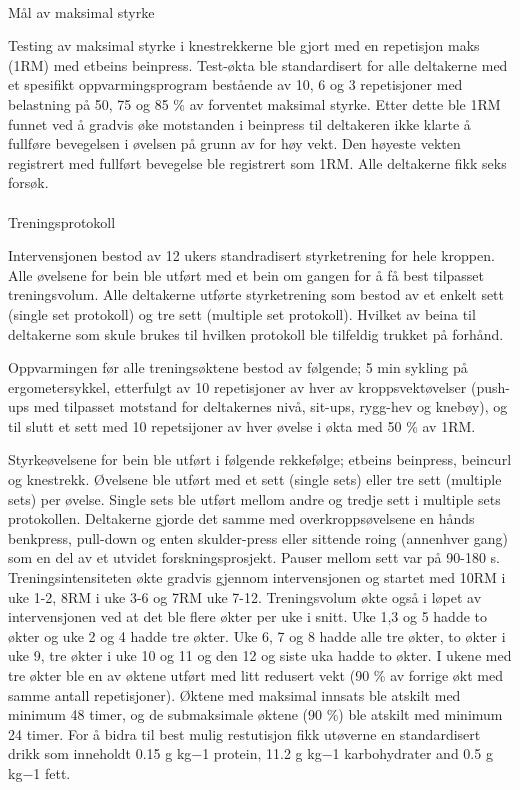 \documentclass[
  letterpaper,
  DIV=11,
  numbers=noendperiod]{scrreprt}
\makeatletter
\let\oldparagraph\paragraph
\renewcommand{\paragraph}{
    \@ifstar
      \xxxParagraphStar
      \xxxParagraphNoStar
  }
\newcommand{\xxxParagraphStar}[1]{\oldparagraph*{#1}\mbox{}}
\newcommand{\xxxParagraphNoStar}[1]{\oldparagraph{#1}\mbox{}}
\makeatother
\begin{document}
\paragraph{Mål av maksimal styrke}\label{muxe5l-av-maksimal-styrke}

Testing av maksimal styrke i knestrekkerne ble gjort med en repetisjon
maks (1RM) med etbeins beinpress. Test-økta ble standardisert for alle
deltakerne med et spesifikt oppvarmingsprogram bestående av 10, 6 og 3
repetisjoner med belastning på 50, 75 og 85 \% av forventet maksimal
styrke. Etter dette ble 1RM funnet ved å gradvis øke motstanden i
beinpress til deltakeren ikke klarte å fullføre bevegelsen i øvelsen på
grunn av for høy vekt. Den høyeste vekten registrert med fullført
bevegelse ble registrert som 1RM. Alle deltakerne fikk seks forsøk.

\paragraph{Treningsprotokoll}\label{treningsprotokoll}

Intervensjonen bestod av 12 ukers standradisert styrketrening for hele
kroppen. Alle øvelsene for bein ble utført med et bein om gangen for å
få best tilpasset treningsvolum. Alle deltakerne utførte styrketrening
som bestod av et enkelt sett (single set protokoll) og tre sett
(multiple set protokoll). Hvilket av beina til deltakerne som skule
brukes til hvilken protokoll ble tilfeldig trukket på forhånd.

Oppvarmingen før alle treningsøktene bestod av følgende; 5 min sykling
på ergometersykkel, etterfulgt av 10 repetisjoner av hver av
kroppsvektøvelser (push-ups med tilpasset motstand for deltakernes nivå,
sit-ups, rygg-hev og knebøy), og til slutt et sett med 10 repetsijoner
av hver øvelse i økta med 50 \% av 1RM.

Styrkeøvelsene for bein ble utført i følgende rekkefølge; etbeins
beinpress, beincurl og knestrekk. Øvelsene ble utført med et sett
(single sets) eller tre sett (multiple sets) per øvelse. Single sets ble
utført mellom andre og tredje sett i multiple sets protokollen.
Deltakerne gjorde det samme med overkroppsøvelsene en hånds benkpress,
pull-down og enten skulder-press eller sittende roing (annenhver gang)
som en del av et utvidet forskningsprosjekt. Pauser mellom sett var på
90-180 s. Treningsintensiteten økte gradvis gjennom intervensjonen og
startet med 10RM i uke 1-2, 8RM i uke 3-6 og 7RM uke 7-12. Treningsvolum
økte også i løpet av intervensjonen ved at det ble flere økter per uke i
snitt. Uke 1,3 og 5 hadde to økter og uke 2 og 4 hadde tre økter. Uke 6,
7 og 8 hadde alle tre økter, to økter i uke 9, tre økter i uke 10 og 11
og den 12 og siste uka hadde to økter. I ukene med tre økter ble en av
øktene utført med litt redusert vekt (90 \% av forrige økt med samme
antall repetisjoner). Øktene med maksimal innsats ble atskilt med
minimum 48 timer, og de submaksimale øktene (90 \%) ble atskilt med
minimum 24 timer. For å bidra til best mulig restutisjon fikk utøverne
en standardisert drikk som inneholdt 0.15 g kg−1 protein, 11.2 g kg−1
karbohydrater and 0.5 g kg−1 fett.
\end{document}
